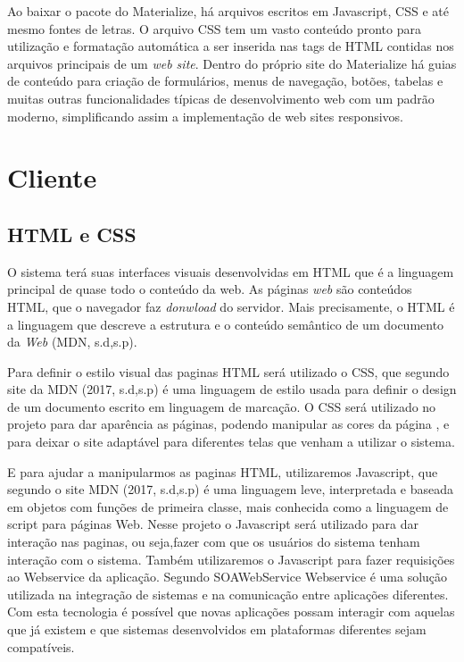 \documentclass[openright]{ifrs} %
\begin{document}
 Ao baixar o pacote do Materialize, há arquivos escritos em Javascript, CSS e até mesmo fontes de letras. O arquivo CSS tem um vasto conteúdo pronto para utilização e formatação automática a ser inserida nas tags de HTML contidas nos arquivos principais de um \textit{web site}. Dentro do próprio site do Materialize há guias de conteúdo para criação de formulários, menus de navegação, botões, tabelas e muitas outras funcionalidades típicas de desenvolvimento web com um padrão moderno, simplificando assim a implementação de web sites responsivos.

\section{Cliente}

\subsection{HTML e CSS}
O sistema terá suas interfaces visuais desenvolvidas em HTML que é a linguagem principal de quase todo o conteúdo da web. As páginas \textit{web} são conteúdos HTML, que o navegador faz \textit{donwload} do servidor. Mais precisamente, o HTML é a linguagem que descreve a estrutura e o conteúdo semântico de um documento da \textit{Web} (MDN, s.d,s.p).

Para definir o estilo visual das paginas HTML será utilizado o CSS, que segundo site da MDN (2017, s.d,s.p) é uma linguagem de estilo usada para definir o design de um documento escrito em linguagem de marcação. O CSS será utilizado no projeto para dar aparência as páginas, podendo manipular as cores da página , e para deixar o site adaptável para diferentes telas que venham a utilizar o sistema.

E para ajudar a manipularmos as paginas HTML, utilizaremos Javascript, que segundo o site MDN (2017, s.d,s.p)  é uma linguagem leve, interpretada e baseada em objetos com funções de primeira classe, mais conhecida como a linguagem de script para páginas Web. Nesse projeto o Javascript será utilizado para dar interação nas paginas, ou seja,fazer com que os usuários do sistema tenham interação com o sistema. Também utilizaremos o Javascript para fazer requisições ao Webservice da aplicação. Segundo SOAWebService \cite{SOAWebService} Webservice é uma solução utilizada na integração de sistemas e na comunicação entre aplicações diferentes. Com esta tecnologia é possível que novas aplicações possam interagir com aquelas que já existem e que sistemas desenvolvidos em plataformas diferentes sejam compatíveis.
\end{document}
